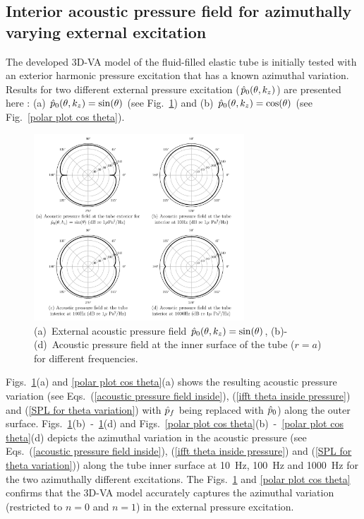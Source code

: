 \documentclass[twocolumn,10pt]{asme2ej}
\begin{document}
\subsection{Interior acoustic pressure field for azimuthally varying external excitation}
\label{azimuthal excitation}
The developed 3D-VA model of the fluid-filled elastic tube is initially tested with an exterior harmonic pressure excitation that has a known azimuthal variation. Results for two different external pressure excitation ($\Hat{p}_0(\theta,k_z)$) are presented here : (a) $\Hat{p}_0(\theta,k_z) = \sin(\theta)$ (see Fig.~\ref{polar plot sin theta}) and (b) $\Hat{p}_0(\theta,k_z) = \cos(\theta)$ (see Fig.~\ref{polar plot cos theta}).


\begin{figure}[h]
    \centering
    \includegraphics[width=3.1in]{figure/polarplot_sin(theta).pdf}
    \caption{(a)~External acoustic pressure field $\Hat{p}_0(\theta,k_z) =\sin(\theta)$, (b)-(d)~Acoustic pressure field at the inner surface of the tube ($r=a$) for different frequencies.}
    \label{polar plot sin theta}
\end{figure}

Figs.~\ref{polar plot sin theta}(a) and \ref{polar plot cos theta}(a) shows the resulting acoustic pressure variation (see Eqs.~(\ref{acoustic pressure field inside}), (\ref{ifft theta inside pressure}) and (\ref{SPL for theta variation}) with $\Hat{p}_f$ being replaced with $\Hat{p}_0$) along the outer surface. Figs.~\ref{polar plot sin theta}(b)~-~\ref{polar plot sin theta}(d) and Figs.~\ref{polar plot cos theta}(b)~-~\ref{polar plot cos theta}(d) depicts the azimuthal variation in the acoustic pressure (see Eqs.~(\ref{acoustic pressure field inside}), (\ref{ifft theta inside pressure}) and (\ref{SPL for theta variation})) along the tube inner surface at 10~Hz, 100~Hz and 1000~Hz for the two azimuthally different excitations. The Figs.~\ref{polar plot sin theta} and \ref{polar plot cos theta} confirms that the 3D-VA model accurately captures the azimuthal variation (restricted to $n=0$ and $n=1$) in the external pressure excitation.
\end{document}

